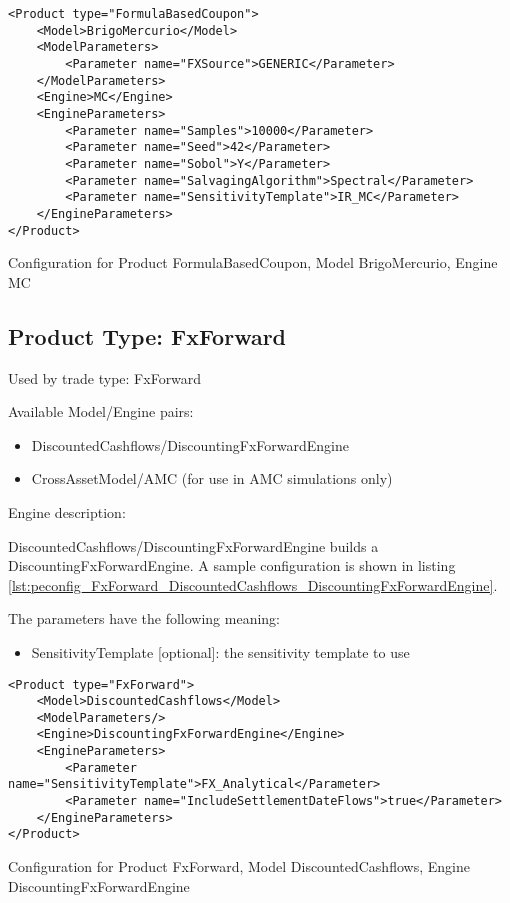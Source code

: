 \begin{longlisting}
\begin{verbatim}
<Product type="FormulaBasedCoupon">
    <Model>BrigoMercurio</Model>
    <ModelParameters>
        <Parameter name="FXSource">GENERIC</Parameter>
    </ModelParameters>
    <Engine>MC</Engine>
    <EngineParameters>
        <Parameter name="Samples">10000</Parameter>
        <Parameter name="Seed">42</Parameter>
        <Parameter name="Sobol">Y</Parameter>
        <Parameter name="SalvagingAlgorithm">Spectral</Parameter>
        <Parameter name="SensitivityTemplate">IR_MC</Parameter>
    </EngineParameters>
</Product>
\end{verbatim}
\caption{Configuration for Product FormulaBasedCoupon, Model BrigoMercurio, Engine MC}
\label{lst:peconfig_FormulaBasedCoupon_BrigoMercurio_MC}
\end{longlisting}

\subsection{Product Type: FxForward}

Used by trade type: FxForward

Available Model/Engine pairs:

\begin{itemize}
\item DiscountedCashflows/DiscountingFxForwardEngine
\item CrossAssetModel/AMC (for use in AMC simulations only)
\end{itemize}

Engine description:

DiscountedCashflows/DiscountingFxForwardEngine builds a DiscountingFxForwardEngine. A sample configuration is shown in
listing \ref{lst:peconfig_FxForward_DiscountedCashflows_DiscountingFxForwardEngine}.

The parameters have the following meaning:

\begin{itemize}
\item SensitivityTemplate [optional]: the sensitivity template to use 
\end{itemize}

\begin{longlisting}
\begin{verbatim}
<Product type="FxForward">
    <Model>DiscountedCashflows</Model>
    <ModelParameters/>
    <Engine>DiscountingFxForwardEngine</Engine>
    <EngineParameters>
        <Parameter name="SensitivityTemplate">FX_Analytical</Parameter>
        <Parameter name="IncludeSettlementDateFlows">true</Parameter>
    </EngineParameters>
</Product>
\end{verbatim}
\caption{Configuration for Product FxForward, Model DiscountedCashflows, Engine DiscountingFxForwardEngine}
\label{lst:peconfig_FxForward_DiscountedCashflows_DiscountingFxForwardEngine}
\end{longlisting}

